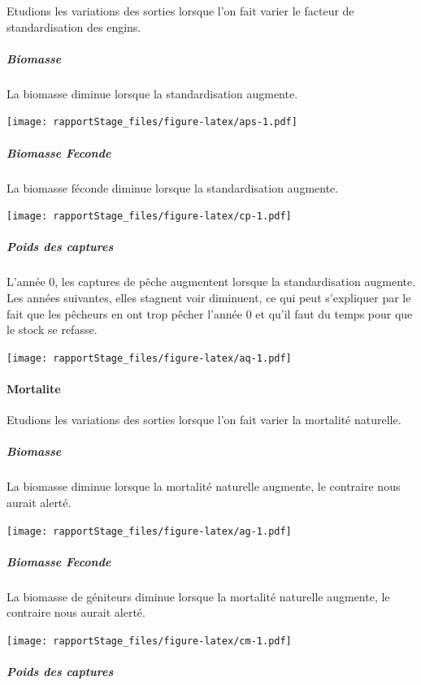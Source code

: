 \documentclass[
]{article}
\begin{document}
Etudions les variations des sorties lorsque l'on fait varier le facteur
de standardisation des engins.

\hypertarget{biomasse-3}{%
\subparagraph{Biomasse}\label{biomasse-3}}

La biomasse diminue lorsque la standardisation augmente.

\texttt{[image: rapportStage\_files/figure-latex/aps-1.pdf]}

\hypertarget{biomasse-feconde-2}{%
\subparagraph{Biomasse Feconde}\label{biomasse-feconde-2}}

La biomasse féconde diminue lorsque la standardisation augmente.

\texttt{[image: rapportStage\_files/figure-latex/cp-1.pdf]}

\hypertarget{poids-des-captures-2}{%
\subparagraph{Poids des captures}\label{poids-des-captures-2}}

L'année 0, les captures de pêche augmentent lorsque la standardisation
augmente. Les années suivantes, elles stagnent voir diminuent, ce qui
peut s'expliquer par le fait que les pêcheurs en ont trop pêcher l'année
0 et qu'il faut du temps pour que le stock se refasse.

\texttt{[image: rapportStage\_files/figure-latex/aq-1.pdf]}

\hypertarget{mortalite}{%
\paragraph{Mortalite}\label{mortalite}}

Etudions les variations des sorties lorsque l'on fait varier la
mortalité naturelle.

\hypertarget{biomasse-4}{%
\subparagraph{Biomasse}\label{biomasse-4}}

La biomasse diminue lorsque la mortalité naturelle augmente, le
contraire nous aurait alerté.

\texttt{[image: rapportStage\_files/figure-latex/ag-1.pdf]}

\hypertarget{biomasse-feconde-3}{%
\subparagraph{Biomasse Feconde}\label{biomasse-feconde-3}}

La biomasse de géniteurs diminue lorsque la mortalité naturelle
augmente, le contraire nous aurait alerté.

\texttt{[image: rapportStage\_files/figure-latex/cm-1.pdf]}

\hypertarget{poids-des-captures-3}{%
\subparagraph{Poids des captures}\label{poids-des-captures-3}}
\end{document}
